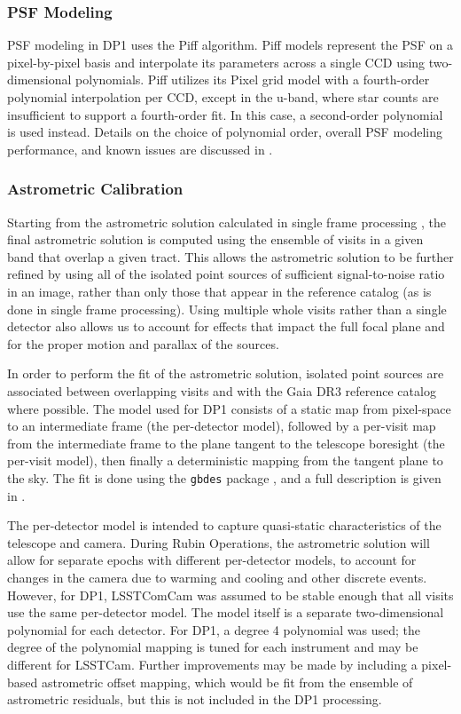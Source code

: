 \subsubsection{PSF Modeling}
\label{ssec:psf_modelling}
PSF modeling in DP1 uses the Piff \citep{DES:2020vau} algorithm. 
Piff models represent the PSF on a pixel-by-pixel basis and interpolate its parameters across a single CCD using two-dimensional polynomials.
Piff utilizes its Pixel grid model with a fourth-order polynomial interpolation per CCD, except in the u-band, where star counts are insufficient to support a fourth-order fit. 
In this case, a second-order polynomial is used instead. 
Details on the choice of polynomial order, overall PSF modeling performance, and known issues are discussed in .

\subsubsection{Astrometric Calibration}
\label{ssec:global_astrometric_calibration}
Starting from the astrometric solution calculated in single frame processing , the final astrometric solution is computed using the ensemble of visits in a given band that overlap a given tract.
This allows the astrometric solution to be further refined by using all of the isolated point sources of sufficient signal-to-noise ratio in an image, rather than only those that appear in the reference catalog (as is done in single frame processing).
Using multiple whole visits rather than a single detector also allows us to account for effects that impact the full focal plane and for the proper motion and parallax of the sources.

In order to perform the fit of the astrometric solution, isolated point sources are associated between overlapping visits and with the Gaia DR3 reference catalog where possible.
The model used for DP1 consists of a static map from pixel-space to an intermediate frame (the per-detector model), followed by a per-visit map from the intermediate frame to the plane tangent to the telescope boresight (the per-visit model), then finally a deterministic mapping from the tangent plane to the sky.
The fit is done using the \texttt{gbdes} package \citep{Bernstein2017}, and a full description is given in \citet{dmtn-266}.

The per-detector model is intended to capture quasi-static characteristics of the telescope and camera.
During Rubin Operations, the astrometric solution will allow for separate epochs with different per-detector models, to account for changes in the camera due to warming and cooling and other discrete events.
However, for DP1, LSSTComCam was assumed to be stable enough that all visits use the same per-detector model. The model itself is a separate two-dimensional polynomial for each detector.
For DP1, a degree 4 polynomial was used; the degree of the polynomial mapping is tuned for each instrument and may be different for LSSTCam.
Further improvements may be made by including a pixel-based astrometric offset mapping, which would be fit from the ensemble of astrometric residuals, but this is not included in the DP1 processing.

